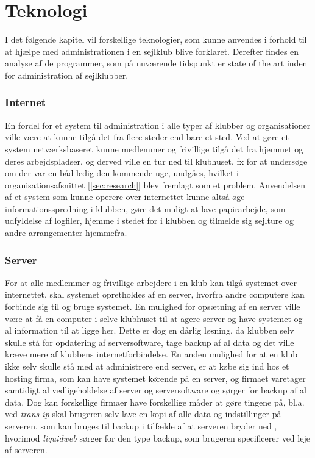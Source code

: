 \chapter{Teknologi}\label{chap:teknologi-analyse}
I det følgende kapitel vil forskellige teknologier, som kunne anvendes i forhold til at hjælpe med administrationen i en sejlklub blive forklaret.
Derefter findes en analyse af de programmer, som på nuværende tidspunkt er state of the art inden for administration af sejlklubber.  
\subsection*{Internet}
En fordel for et system til administration i alle typer af klubber og organisationer ville være at kunne tilgå det fra flere steder end bare et sted. 
Ved at gøre et system netværksbaseret kunne medlemmer og frivillige tilgå det fra hjemmet og deres arbejdspladser, og derved ville en tur ned til klubhuset, fx for at undersøge om der var en båd ledig den kommende uge, undgåes, hvilket i organisationsafsnittet [\ref{sec:research}] blev fremlagt som et problem. 
Anvendelsen af et system som kunne operere over internettet kunne altså øge informationsspredning i klubben, gøre det muligt at lave papirarbejde, som udfyldelse af logfiler, hjemme i stedet for i klubben og tilmelde sig sejlture og andre arrangementer hjemmefra.
  
\subsection*{Server}
For at alle medlemmer og frivillige arbejdere i en klub kan tilgå systemet over internettet, skal systemet opretholdes af en server, hvorfra andre computere kan forbinde sig til og bruge systemet. 
En mulighed for opsætning af en server ville være at få en computer i selve klubhuset til at agere server og have systemet og al information til at ligge her. 
Dette er dog en dårlig løsning, da klubben selv skulle stå for opdatering af serversoftware, tage backup af al data og det ville kræve mere af klubbens internetforbindelse. 
En anden mulighed for at en klub ikke selv skulle stå med at administrere end server, er at købe sig ind hos et hosting firma, som kan have systemet kørende på en server, og firmaet varetager samtidigt al vedligeholdelse af server og serversoftware og sørger for backup af al data. 
Dog kan forskellige firmaer have forskellige måder at gøre tingene på, bl.a. ved \textit{trans ip} skal brugeren selv lave en kopi af alle data og indstillinger på serveren, som kan bruges til backup i tilfælde af at serveren bryder ned \citep{Virtuelserver}, hvorimod \textit{liquidweb} \citep{liquid} sørger for den type backup, som brugeren specificerer ved leje af serveren.

